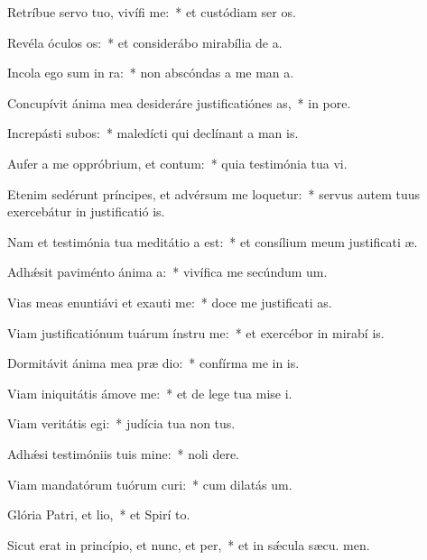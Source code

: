 \item Retríbue servo tuo, vivífi me:~* et custódiam ser os.
\item Revéla óculos os:~* et considerábo mirabília de  a.
\item Incola ego sum in ra:~* non abscóndas a me man a.
\item Concupívit ánima mea desideráre justificatiónes as,~* in  pore.
\item Increpásti subos:~* maledícti qui declínant a man is.
\item Aufer a me oppróbrium, et contum:~* quia testimónia tua vi.
\item Etenim sedérunt príncipes, et advérsum me loquetur:~* servus autem tuus exercebátur in justificatió is.
\item Nam et testimónia tua meditátio a est:~* et consílium meum justificati æ.
\item Adhǽsit paviménto ánima a:~* vivífica me secúndum  um.
\item Vias meas enuntiávi et exauti me:~* doce me justificati as.
\item Viam justificatiónum tuárum ínstru me:~* et exercébor in mirabí is.
\item Dormitávit ánima mea præ dio:~* confírma me in  is.
\item Viam iniquitátis ámove  me:~* et de lege tua mise i.
\item Viam veritátis egi:~* judícia tua non  tus.
\item Adhǽsi testimóniis tuis mine:~* noli  dere.
\item Viam mandatórum tuórum curi:~* cum dilatás  um.
\item Glória Patri, et lio,~* et Spirí to.
\item Sicut erat in princípio, et nunc, et per,~* et in sǽcula sæcu. men.

